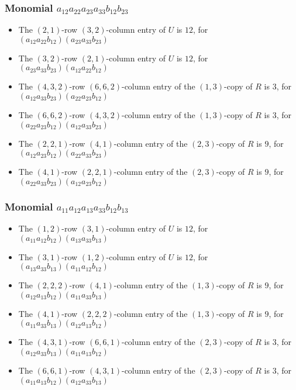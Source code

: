 \documentclass{article}
\begin{document}
\subsubsection{Monomial $ a_{12} a_{22} a_{23} a_{33} b_{12} b_{23} $}

\begin{itemize}
\item The $ \left(2, 1\right) $-row $ \left(3, 2\right) $-column entry of $U$ is $ 12 $, for $( a_{12} a_{22} b_{12} )( a_{23} a_{33} b_{23} )$ 
\item The $ \left(3, 2\right) $-row $ \left(2, 1\right) $-column entry of $U$ is $ 12 $, for $( a_{23} a_{33} b_{23} )( a_{12} a_{22} b_{12} )$ 
\item The $(4, 3, 2)$-row $(6, 6, 2)$-column entry of the $ \left(1, 3\right) $-copy of $R$ is $ 3 $, for $( a_{12} a_{33} b_{23} )( a_{22} a_{23} b_{12} )$ 
\item The $(6, 6, 2)$-row $(4, 3, 2)$-column entry of the $ \left(1, 3\right) $-copy of $R$ is $ 3 $, for $( a_{22} a_{23} b_{12} )( a_{12} a_{33} b_{23} )$ 
\item The $(2, 2, 1)$-row $(4, 1)$-column entry of the $ \left(2, 3\right) $-copy of $R$ is $ 9 $, for $( a_{12} a_{23} b_{12} )( a_{22} a_{33} b_{23} )$ 
\item The $(4, 1)$-row $(2, 2, 1)$-column entry of the $ \left(2, 3\right) $-copy of $R$ is $ 9 $, for $( a_{22} a_{33} b_{23} )( a_{12} a_{23} b_{12} )$ 
\end{itemize}
\subsubsection{Monomial $ a_{11} a_{12} a_{13} a_{33} b_{12} b_{13} $}

\begin{itemize}
\item The $ \left(1, 2\right) $-row $ \left(3, 1\right) $-column entry of $U$ is $ 12 $, for $( a_{11} a_{12} b_{12} )( a_{13} a_{33} b_{13} )$ 
\item The $ \left(3, 1\right) $-row $ \left(1, 2\right) $-column entry of $U$ is $ 12 $, for $( a_{13} a_{33} b_{13} )( a_{11} a_{12} b_{12} )$ 
\item The $(2, 2, 2)$-row $(4, 1)$-column entry of the $ \left(1, 3\right) $-copy of $R$ is $ 9 $, for $( a_{12} a_{13} b_{12} )( a_{11} a_{33} b_{13} )$ 
\item The $(4, 1)$-row $(2, 2, 2)$-column entry of the $ \left(1, 3\right) $-copy of $R$ is $ 9 $, for $( a_{11} a_{33} b_{13} )( a_{12} a_{13} b_{12} )$ 
\item The $(4, 3, 1)$-row $(6, 6, 1)$-column entry of the $ \left(2, 3\right) $-copy of $R$ is $ 3 $, for $( a_{12} a_{33} b_{13} )( a_{11} a_{13} b_{12} )$ 
\item The $(6, 6, 1)$-row $(4, 3, 1)$-column entry of the $ \left(2, 3\right) $-copy of $R$ is $ 3 $, for $( a_{11} a_{13} b_{12} )( a_{12} a_{33} b_{13} )$ 
\end{itemize}
\end{document}
